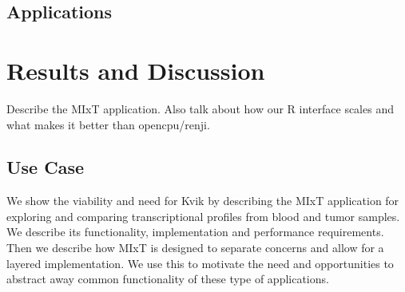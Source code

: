 \subsection*{Applications}




\section*{Results and Discussion}
Describe the MIxT application. Also talk about how our R interface scales and
what makes it better than opencpu/renji.

%
%

\subsection*{Use Case}


We show the viability and need for Kvik by describing the MIxT application for
exploring and comparing transcriptional profiles from blood and tumor samples.
We describe its functionality, implementation 
and performance requirements.
Then we describe how MIxT
is designed to separate concerns and allow for a layered implementation. We use
this to motivate the need and opportunities to abstract away common
functionality of these type of applications.

